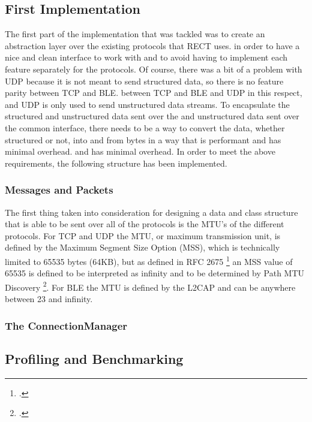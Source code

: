 \subsection{First Implementation}
The first part of the implementation that was tackled was to create an abstraction layer over the existing protocols that RECT uses.
in order to have a nice and clean interface to work with and to avoid having to implement each feature separately for the
protocols. Of course, there was a bit of a problem with UDP because it is not meant to send structured data, so there is no feature parity between TCP and BLE.
between TCP and BLE and UDP in this respect, and UDP is only used to send unstructured data streams. To encapsulate the structured and unstructured data sent over the
and unstructured data sent over the common interface, there needs to be a way to convert the data, whether structured or not, into and from bytes in a way that is performant and has minimal overhead.
and has minimal overhead. In order to meet the above requirements, the following structure has been implemented.
 
\subsubsection{Messages and Packets}
The first thing taken into consideration for designing a data and class structure that is able to be sent over all of the protocols is the MTU's of the different protocols. 
For TCP and UDP the MTU, or maximum transmission unit, is defined by the Maximum Segment Size Option (MSS), which is technically limited to 65535 bytes (64KB), but as defined
in RFC 2675 \footcite{rfc2675} an MSS value of 65535 is defined to be interpreted as infinity and to be determined by Path MTU Discovery \footcite{rfc9293}. For BLE the MTU is 
defined by the L2CAP and can be anywhere between 23 and infinity. 


\subsubsection{The ConnectionManager}


\subsection{Profiling and Benchmarking}

